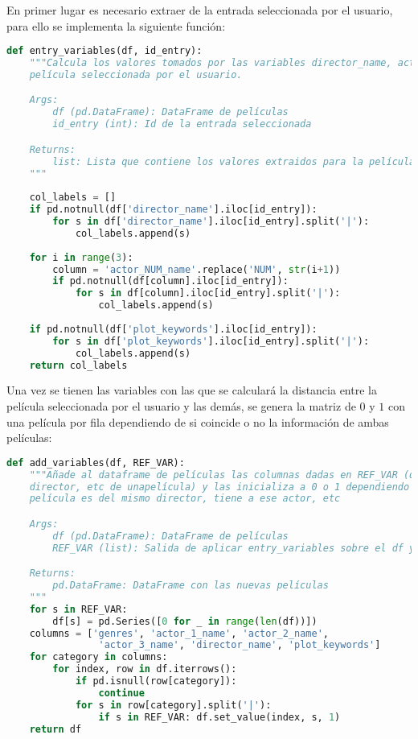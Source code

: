 En primer lugar es necesario extraer de la entrada seleccionada por el usuario, para ello se implementa la siguiente función:
\begin{lstlisting}[language=Python, caption= Variables utilizadas para la creación de la matriz.]
def entry_variables(df, id_entry): 
    """Calcula los valores tomados por las variables director_name, actor_[1,2,3]_name y plot_keywords para la
    película seleccionada por el usuario.

    Args:
        df (pd.DataFrame): DataFrame de películas
        id_entry (int): Id de la entrada seleccionada

    Returns:
        list: Lista que contiene los valores extraidos para la película seleccionada
    """
    
    col_labels = []    
    if pd.notnull(df['director_name'].iloc[id_entry]):
        for s in df['director_name'].iloc[id_entry].split('|'):
            col_labels.append(s)
            
    for i in range(3):
        column = 'actor_NUM_name'.replace('NUM', str(i+1))
        if pd.notnull(df[column].iloc[id_entry]):
            for s in df[column].iloc[id_entry].split('|'):
                col_labels.append(s)
                
    if pd.notnull(df['plot_keywords'].iloc[id_entry]):
        for s in df['plot_keywords'].iloc[id_entry].split('|'):
            col_labels.append(s)
    return col_labels
\end{lstlisting}

Una vez se tienen las variables con las que se calculará la distancia entre la película seleccionada por el usuario y las demás, se genera la matriz de $0$ y $1$ con una película por fila dependiendo de si coincide o no la información de ambas películas:

\begin{lstlisting}[language=Python, caption= Creación de la matriz de coordenadas de las películas.]
def add_variables(df, REF_VAR):
    """Añade al dataframe de películas las columnas dadas en REF_VAR (que serán el 
    director, etc de unapelícula) y las inicializa a 0 o 1 dependiendo de si la 
    película es del mismo director, tiene a ese actor, etc

    Args:
        df (pd.DataFrame): DataFrame de películas
        REF_VAR (list): Salida de aplicar entry_variables sobre el df y una película

    Returns:
        pd.DataFrame: DataFrame con las nuevas películas
    """
    for s in REF_VAR: 
        df[s] = pd.Series([0 for _ in range(len(df))])
    columns = ['genres', 'actor_1_name', 'actor_2_name',
                'actor_3_name', 'director_name', 'plot_keywords']
    for category in columns:
        for index, row in df.iterrows():
            if pd.isnull(row[category]): 
                continue
            for s in row[category].split('|'):
                if s in REF_VAR: df.set_value(index, s, 1)            
    return df
\end{lstlisting}

